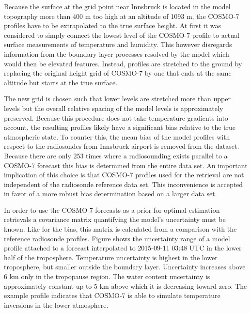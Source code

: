         {}

    Because the surface at the grid point near Innsbruck is located in the model
    topography more than 400 m too high at an altitude of 1093 m, the COSMO-7
    profiles have to be extrapolated to the true surface height. At first it was
    considered to simply connect the lowest level of the COSMO-7 profile to
    actual surface measurements of temperature and humidity. This however
    disregards information from the boundary layer processes resolved by the
    model which would then be elevated features. Instead, profiles are
    stretched to the ground by replacing the original height grid of COSMO-7
    by one that ends at the same altitude but starts at the true surface.

    The new grid is chosen such that lower levels are stretched more than
    upper levels but the overall relative spacing of the model levels is
    approximately preserved. Because this procedure does not take temperature
    gradients into account, the resulting profiles likely have a significant
    bias relative to the true atmospheric state. To counter this, the mean
    bias of the model profiles with respect to the radiosondes from Innsbruck
    airport is removed from the dataset. Because there are only 253 times
    where a radiosounding exists parallel to a COSMO-7 forecast this bias is
    determined from the entire data set. An important implication of this
    choice is that COSMO-7 profiles used for the retrieval are not independent
    of the radiosonde reference data set. This inconvenience is accepted in
    favor of a more robust bias determination based on a larger data set.

    In order to use the COSMO-7 forecasts as a prior for optimal estimation
    retrievals a covariance matrix quantifying the model's uncertainty must
    be known. Like for the bias, this matrix is calculated from a comparison
    with the reference radiosonde profiles. Figure 
    shows the uncertainty range of a model profile attached to a forecast
    interpolated to 2015-09-11 03:48 UTC in the lower half of the troposphere.
    Temperature uncertainty is highest in the lower troposphere, but smaller
    outside the boundary layer. Uncertainty increases above 6 km only in the
    tropopause region. The water content uncertainty is approximately constant
    up to 5 km above which it is decreasing toward zero. The example profile
    indicates that COSMO-7 is able to simulate temperature inversions in the
    lower atmosphere.

